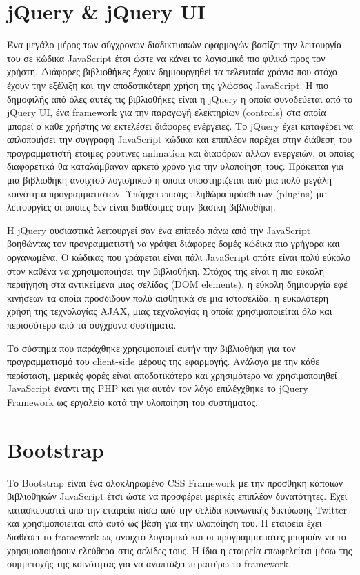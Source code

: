 \section {jQuery \& jQuery UI}
Ένα μεγάλο μέρος των σύγχρονων διαδικτυακών εφαρμογών βασίζει την λειτουργία του σε κώδικα JavaScript έτσι ώστε να κάνει το λογισμικό πιο φιλικό προς τον χρήστη. Διάφορες βιβλιοθήκες έχουν δημιουργηθεί τα τελευταία χρόνια που στόχο έχουν την εξέλιξη και την αποδοτικότερη χρήση της γλώσσας JavaScript. Η πιο δημοφιλής από όλες αυτές τις βιβλιοθήκες είναι η jQuery η οποία συνοδεύεται από το jQuery UI, ένα framework για την παραγωγή ελεκτηρίων (controls) στα οποία μπορεί ο κάθε χρήστης να εκτελέσει διάφορες ενέργειες. Το jQuery έχει καταφέρει να απλοποιήσει την συγγραφή JavaScript κώδικα και επιπλέον παρέχει στην διάθεση του προγραμματιστή έτοιμες ρουτίνες animation και διαφόρων άλλων ενεργειών, οι οποίες διαφορετικά θα καταλάμβαναν αρκετό χρόνο για την υλοποίηση τους. Πρόκειται για μια βιβλιοθήκη ανοιχτού λογισμικού η οποία υποστηρίζεται από μια πολύ μεγάλη κοινότητα προγραμματιστών. Υπάρχει επίσης πληθώρα πρόσθετων (plugins) με λειτουργίες οι οποίες δεν είναι διαθέσιμες στην βασική βιβλιοθήκη.

Η jQuery ουσιαστικά λειτουργεί σαν ένα επίπεδο πάνω από την JavaScript βοηθώντας τον προγραμματιστή να γράψει διάφορες δομές κώδικα πιο γρήγορα και οργανωμένα. Ο κώδικας που γράφεται είναι πάλι JavaScript οπότε είναι πολύ εύκολο στον καθένα να χρησιμοποιήσει την βιβλιοθήκη. Στόχος της είναι η πιο εύκολη περιήγηση στα αντικείμενα μιας σελίδας (DOM elements), η εύκολη δημιουργία εφέ κινήσεων τα οποία προσδίδουν πολύ αισθητικά σε μια ιστοσελίδα, η ευκολότερη χρήση της τεχνολογίας AJAX, μιας τεχνολογίας η οποία χρησιμοποιείται όλο και περισσότερο από τα σύγχρονα συστήματα.

Το σύστημα που παράχθηκε χρησιμοποιεί αυτήν την βιβλιοθήκη για τον προγραμματισμό του client-side μέρους της εφαρμογής. Ανάλογα με την κάθε περίσταση, μερικές φορές είναι αποδοτικότερο και χρησιμότερο να χρησιμοποιηθεί JavaScript έναντι της PHP και για αυτόν τον λόγο επιλέγχθηκε το jQuery Framework ως εργαλείο κατά την υλοποίηση του συστήματος.

\section {Bootstrap}
Το Bootstrap είναι ένα ολοκληρωμένο CSS Framework με την προσθήκη κάποιων βιβλιοθηκών JavaScript έτσι ώστε να προσφέρει μερικές επιπλέον δυνατότητες. Έχει κατασκευαστεί από την εταιρεία πίσω από την σελίδα κοινωνικής δικτύωσης Twitter και χρησιμοποιείται από αυτό ως βάση για την υλοποίηση του. Η εταιρεία έχει διαθέσει το framework ως ανοιχτό λογισμικό και οι προγραμματιστές μπορούν να το χρησιμοποιήσουν ελεύθερα στις σελίδες τους. Η ίδια η εταιρεία επωφελείται μέσω της συμμετοχής της κοινότητας για να αναπτύξει περαιτέρω το framework.

